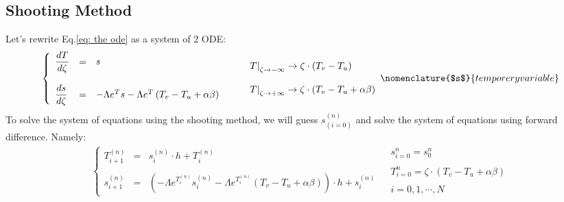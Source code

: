\documentclass[11pt, a4paper]{article}
\begin{document}
\subsection{Shooting Method}
Let's rewrite Eq.\ref{eq: the ode} as a system of 2 ODE:
\begin{equation}
    \begin{matrix}
        \left\{\begin{array}{lcl}
            \displaystyle\frac{dT}{d\zeta} & = & s \\\\
            \displaystyle\frac{ds}{d\zeta} & = & -\Lambda e^Ts-\Lambda e^{T}\left(T_v-T_u+\alpha\beta\right)
        \end{array}\right. && \begin{array}{l}
            \left.T\right|_{\zeta\rightarrow-\infty}\rightarrow\zeta\cdot\left(T_v-T_u\right) \\\\
            \left.T\right|_{\zeta\rightarrow+\infty}\rightarrow\zeta\cdot\left(T_v-T_u+\alpha\beta\right)
        \end{array}
    \end{matrix}
    \nomenclature{$s$}{temporery variable}
\end{equation}
To solve the system of equations using the shooting method, we will guess $s_{(i=0)}^{(n)}$ and solve the system of equations using forward difference. Namely:
\begin{equation}
    \begin{matrix}
        \left\{\begin{array}{lcl}
            \displaystyle T_{i+1}^{(n)} & = & s_i^{(n)}\cdot h+T_i^{(n)} \\\\
            \displaystyle s_{i+1}^{(n)} & = & \left(-\Lambda e^{T_i^{(n)}}s_i^{(n)}-\Lambda e^{T_i^{(n)}}\left(T_v-T_u+\alpha\beta\right)\right)\cdot h+s_i^{(n)}
        \end{array}\right. & \begin{array}{l}
            s_{i=0}^n=s_0^n \\\\
            T_{i=0}^n=\zeta\cdot\left(T_v-T_u+\alpha\beta\right) \\\\
            i=0,1,\cdots,N
        \end{array}
    \end{matrix}
\end{equation}
\end{document}
